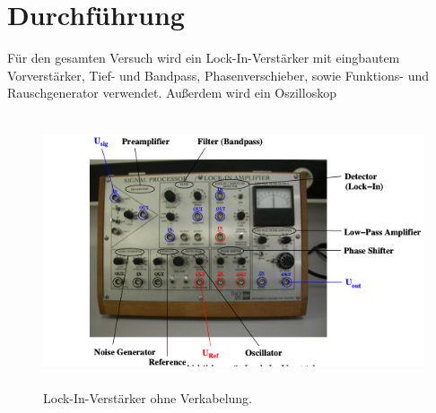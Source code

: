 \section{Durchführung}
\label{sec:Durchführung}
Für den gesamten Versuch wird ein Lock-In-Verstärker mit eingbautem Vorverstärker, Tief- und Bandpass, Phasenverschieber,
sowie Funktions- und Rauschgenerator verwendet. Außerdem wird ein Oszilloskop

\begin{figure} [H]
    \centering
    \includegraphics[height=8cm]{content/Bilder/Aufbau_Bild.png}
    \caption{Lock-In-Verstärker ohne Verkabelung.\cite{v303}}
    \label{fig:Aufbau Lock-In-Verstaerker}
\end{figure}
